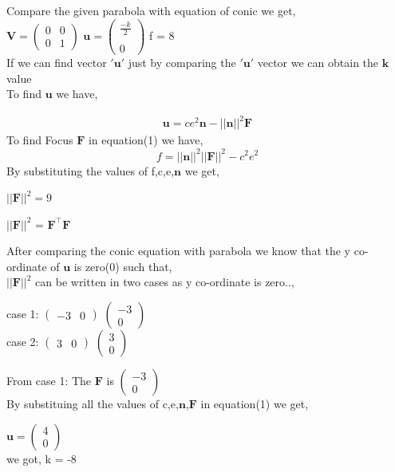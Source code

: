 \documentclass[journal,12pt,twocolumn]{IEEEtran}
\newcommand{\myvec}[1]{\ensuremath{\begin{pmatrix}#1\end{pmatrix}}}
\let\vec\mathbf
\begin{document}
Compare the given parabola with equation of conic we get,\\

$\vec{V} = \myvec{0&0\\0&1}$ $\vec{u} = \myvec{\frac{-k}{2} \\ \\ 0}$ \vspace*{0.2cm} f = 8\\

If we can find vector $\vec{'u'}$ just by comparing the $\vec{'u'}$ vector we can obtain the $\vec{k}$ value\\ 

To find $\vec{u}$ we have,

\begin{align}
\vec{u}=ce^2\vec{n}-||\vec{n}||^2\vec{F}
\end{align}
To find Focus $\vec{F}$ in equation(1) we have,
\begin{equation}
f = ||\vec{n}||^2||\vec{F}||^2-c^2e^2
\end{equation}
By substituting the values of f,c,e,$\vec{n}$ we get,
\begin{center}
$||\vec{F}||^2 = 9$
\end{center}

\begin{center}
$||\vec{F}||^2$ = $\vec{F^{\top}F}$
\end{center}

After comparing the conic equation with parabola we know that the y co-ordinate of $\vec{u}$ is zero(0) such that, \\


$||\vec{F}||^2$ can be written in two cases as y co-ordinate is zero..,
\begin{center}
case 1: $\myvec{-3&0}$ $\myvec{-3\\0}$ \\
case 2: $\myvec{3&0}$ $\myvec{3\\0}$ \\
\end{center}

From case 1: The $\vec{F}$ is $\myvec{-3\\0}$\\

By substituing all the values of c,e,$\vec{n}$,$\vec{F}$ in equation(1) we get,\\

\begin{center}
$\vec{u} = \myvec{4 \\ 0}$ \\ 
\vspace{0.2cm} we got, k = -8
\end{center}
\end{document}
